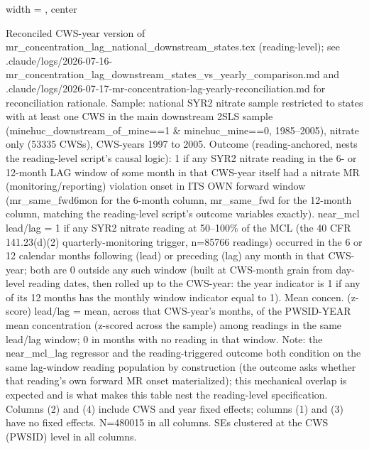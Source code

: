 \begin{table}[htbp]
\begin{adjustbox}{width = \textwidth, center}
      
   \end{adjustbox}
      {\tiny\linespread{1}\selectfont \par \raggedright 
   Reconciled CWS-year version of mr\_concentration\_lag\_national\_downstream\_states.tex (reading-level); see .claude/logs/2026-07-16-mr\_concentration\_lag\_downstream\_states\_vs\_yearly\_comparison.md and .claude/logs/2026-07-17-mr-concentration-lag-yearly-reconciliation.md for reconciliation rationale. Sample: national SYR2 nitrate sample restricted to states with at least one CWS in the main downstream 2SLS sample (minehuc\_downstream\_of\_mine==1 \& minehuc\_mine==0, 1985--2005), nitrate only (53335 CWSs), CWS-years 1997 to 2005. Outcome (reading-anchored, nests the reading-level script's causal logic): 1 if any SYR2 nitrate reading in the 6- or 12-month LAG window of some month in that CWS-year itself had a nitrate MR (monitoring/reporting) violation onset in ITS OWN forward window (mr\_same\_fwd6mon for the 6-month column, mr\_same\_fwd for the 12-month column, matching the reading-level script's outcome variables exactly). near\_mcl lead/lag = 1 if any SYR2 nitrate reading at 50--100\% of the MCL (the 40 CFR 141.23(d)(2) quarterly-monitoring trigger, n=85766 readings) occurred in the 6 or 12 calendar months following (lead) or preceding (lag) any month in that CWS-year; both are 0 outside any such window (built at CWS-month grain from day-level reading dates, then rolled up to the CWS-year: the year indicator is 1 if any of its 12 months has the monthly window indicator equal to 1). Mean concen. (z-score) lead/lag = mean, across that CWS-year's months, of the PWSID-YEAR mean concentration (z-scored across the sample) among readings in the same lead/lag window; 0 in months with no reading in that window. Note: the near\_mcl\_lag regressor and the reading-triggered outcome both condition on the same lag-window reading population by construction (the outcome asks whether that reading's own forward MR onset materialized); this mechanical overlap is expected and is what makes this table nest the reading-level specification. Columns (2) and (4) include CWS and year fixed effects; columns (1) and (3) have no fixed effects. N=480015 in all columns. SEs clustered at the CWS (PWSID) level in all columns.}
   
\end{table}


